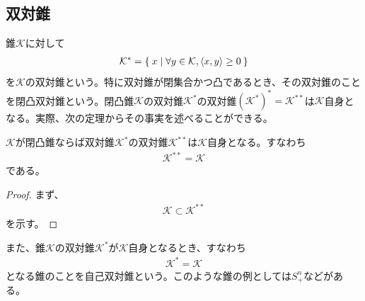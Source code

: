 \subsection{双対錐}
錐$\mathcal{K}$に対して
\begin{align*}
  \mathcal{K}^* = \Set{x | \forall y \in \mathcal{K}, \dot<x, y> \geq 0}
\end{align*}
を$\mathcal{K}$の双対錐という。特に双対錐が閉集合かつ凸であるとき、その双対錐のことを閉凸双対錐という。閉凸錐$\mathcal{K}$の双対錐$\mathcal{K}^*$の双対錐$\left(\mathcal{K}^*\right)^* = \mathcal{K}^{**}$は$\mathcal{K}$自身となる。実際、次の定理からその事実を述べることができる。
\begin{theorem}
  $\mathcal{K}$が閉凸錐ならば双対錐$\mathcal{K}^*$の双対錐$\mathcal{K}^{**}$は$\mathcal{K}$自身となる。すなわち
  \begin{align*}
    \mathcal{K}^{**} = \mathcal{K}
  \end{align*}
  である。
\end{theorem}
\begin{proof}
  まず、
  \begin{align*}
    \mathcal{K} \subset \mathcal{K}^{**}
  \end{align*}
  を示す。
\end{proof}

また、錐$\mathcal{K}$の双対錐$\mathcal{K}^*$が$\mathcal{K}$自身となるとき、すなわち
\begin{align*}
  \mathcal{K}^* = \mathcal{K}
\end{align*}
となる錐のことを自己双対錐という。このような錐の例としては$S_+^n$などがある。
